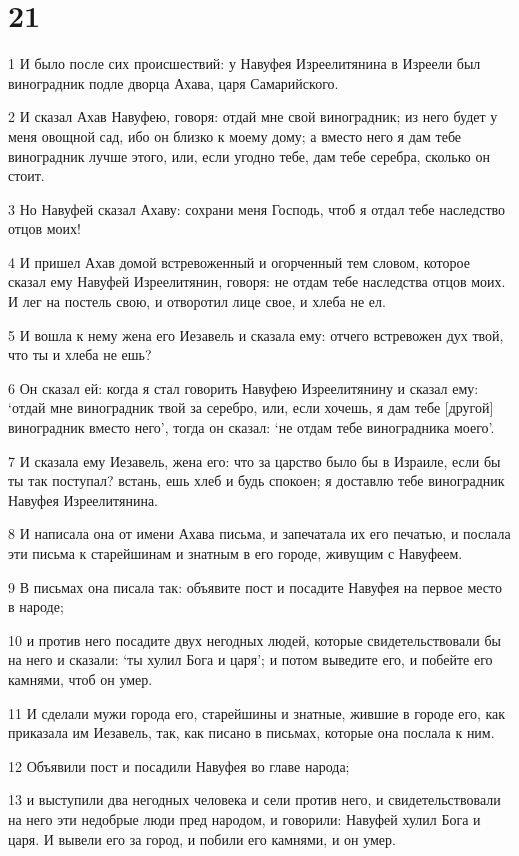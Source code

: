 \chapter{21}

\par 1 И было после сих происшествий: у Навуфея Изреелитянина в Изреели был виноградник подле дворца Ахава, царя Самарийского.
\par 2 И сказал Ахав Навуфею, говоря: отдай мне свой виноградник; из него будет у меня овощной сад, ибо он близко к моему дому; а вместо него я дам тебе виноградник лучше этого, или, если угодно тебе, дам тебе серебра, сколько он стоит.
\par 3 Но Навуфей сказал Ахаву: сохрани меня Господь, чтоб я отдал тебе наследство отцов моих!
\par 4 И пришел Ахав домой встревоженный и огорченный тем словом, которое сказал ему Навуфей Изреелитянин, говоря: не отдам тебе наследства отцов моих. И лег на постель свою, и отворотил лице свое, и хлеба не ел.
\par 5 И вошла к нему жена его Иезавель и сказала ему: отчего встревожен дух твой, что ты и хлеба не ешь?
\par 6 Он сказал ей: когда я стал говорить Навуфею Изреелитянину и сказал ему: `отдай мне виноградник твой за серебро, или, если хочешь, я дам тебе [другой] виноградник вместо него', тогда он сказал: `не отдам тебе виноградника моего'.
\par 7 И сказала ему Иезавель, жена его: что за царство было бы в Израиле, если бы ты так поступал? встань, ешь хлеб и будь спокоен; я доставлю тебе виноградник Навуфея Изреелитянина.
\par 8 И написала она от имени Ахава письма, и запечатала их его печатью, и послала эти письма к старейшинам и знатным в его городе, живущим с Навуфеем.
\par 9 В письмах она писала так: объявите пост и посадите Навуфея на первое место в народе;
\par 10 и против него посадите двух негодных людей, которые свидетельствовали бы на него и сказали: `ты хулил Бога и царя'; и потом выведите его, и побейте его камнями, чтоб он умер.
\par 11 И сделали мужи города его, старейшины и знатные, жившие в городе его, как приказала им Иезавель, так, как писано в письмах, которые она послала к ним.
\par 12 Объявили пост и посадили Навуфея во главе народа;
\par 13 и выступили два негодных человека и сели против него, и свидетельствовали на него эти недобрые люди пред народом, и говорили: Навуфей хулил Бога и царя. И вывели его за город, и побили его камнями, и он умер.
